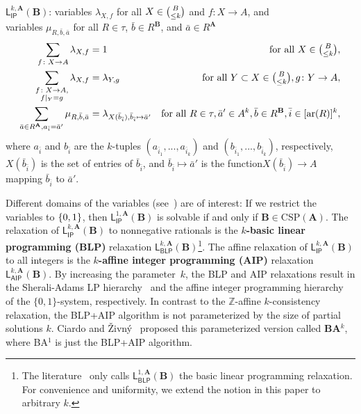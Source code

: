 \documentclass[a4paper,english, thm-restate]{lipics-v2021}
\newcommand{\ZZ}{\mathbb{Z}}
\newcommand{\defining}[1]{\textbf{#1}}
\DeclarePairedDelimiter\set{\lbrace}{\rbrace}
\newcommand{\tup}[1]{\bar{#1}}
\newcommand{\sig}{\tau}
\newcommand{\arity}[1]{\operatorname*{ar}(#1)}
\newcommand{\StructA}{\mathbf{A}}
\newcommand{\StructB}{\mathbf{B}}
\newcommand{\CSP}[1]{\mathrm{CSP}(#1)}
\newcommand{\restrict}[2]{#1|_{#2}}
\newcommand{\leqs}{\mathsf{L}}
\newcommand{\ipk}[3]{\leqs^{#1,#2}_{\mathsf{IP}} (#3)}
\newcommand{\blk}[3]{\leqs^{#1,#2}_{\mathsf{BLP}} (#3)}
\newcommand{\aipk}[3]{\leqs^{#1,#2}_{\mathsf{AIP}} (#3)}
\begin{document}
	\begin{systembox}{$\ipk{k}{\StructA}{\StructB}$: 
			variables $\lambda_{X,f}$ for all $X \in \tbinom{B}{\leq k}$ and  $f\colon X \to A$, and \\\phantom{$\ipk{k}{\StructA}{\StructB}$: }variables $\mu_{R,\tup{b},\tup{a}}$ for all $R \in \sig$, $\tup{b} \in R^\StructB$, and $\tup{a} \in R^\StructA$}
		\setlength{\belowdisplayskip}{2pt}
		\begin{align*}
			\sum_{f \colon X \to A} \lambda_{X,f} &= 1  &\text{for all } X \in \tbinom{B}{\leq k},\\
			\sum_{\substack{f \colon X \to A,\\\restrict{f}{Y} = g}} \lambda_{X,f} &= \lambda_{Y,g} & \text{for all } Y\subset X \in \tbinom{B}{\leq k}, g\colon Y \to A,\\
			\sum_{\tup{a} \in R^\StructA, a_{\tup{i}} = \tup{a}'} \mu_{R,\tup{b},\tup{a}} &= \lambda_{X(\tup{b}_{\tup{i}}), \tup{b}_{\tup{i}} \mapsto \tup{a}' } &  \text {for all } R \in \sig, \tup{a}' \in A^k, \tup{b} \in R^\StructB, \tup{i} \in [\arity{R}]^k,
		\end{align*}
	where $a_{\tup{i}}$ and $b_{\tup{i}}$ are the $k$-tuples $(a_{\tup{i}_1},...,a_{\tup{i}_k})$ and $(b_{\tup{i}_1},...,b_{\tup{i}_k})$, respectively, $X(\tup{b}_{\tup{i}})$ is the set of entries of $\tup{b}_{\tup{i}}$, and $\tup{b}_{\tup{i}} \mapsto \tup{a}'$ is the function$ X(\tup{b}_{\tup{i}})\to A$ mapping $\tup{b}_{\tup{i}}$ to $\tup{a}'$.
	\end{systembox}
	\noindent Different domains of the variables (see~\cite{BrakensiekGWZ2020}) are of interest: If we restrict the variables to $\set{0,1}$, then
	$\ipk{1}{\StructA}{\StructB}$ is solvable if and only if
	$\StructB \in \CSP{\StructA}$.
	The relaxation of $\ipk{k}{\StructA}{\StructB}$ to nonnegative rationals is the \defining{$k$-basic linear programming (BLP)} relaxation $\blk{k}{\StructA}{\StructB}$\footnote{The literature~\cite{BrakensiekGWZ2020, CiardoZivny2023BAk} only calls $\blk{1}{\StructA}{\StructB}$ the basic linear programming relaxation. For convenience and uniformity, we extend the notion in this paper to arbitrary $k$.}.
	The affine relaxation of $\ipk{k}{\StructA}{\StructB}$ to all integers is the \defining{$k$-affine integer programming (AIP)} relaxation $\aipk{k}{\StructA}{\StructB}$.
	By increasing the parameter~$k$, 
	the BLP and AIP relaxations result in the Sherali-Adams LP hierarchy~\cite{sherali1990hierarchy} and
	the affine integer programming hierarchy~\cite{CiardoZivny2023GraphColoring} of the $\{0,1\}$-system, respectively.
In contrast to the $\ZZ$-affine $k$-consistency relaxation,
	the BLP+AIP algorithm is not parameterized by the size of partial solutions $k$.
	Ciardo and Živný~\cite{CiardoZivny2023Tensors,  CiardoZivny2023BAk} proposed this parameterized version called \defining{BA$^k$}, where BA$^1$ is just the BLP+AIP algorithm.
	
\end{document}
